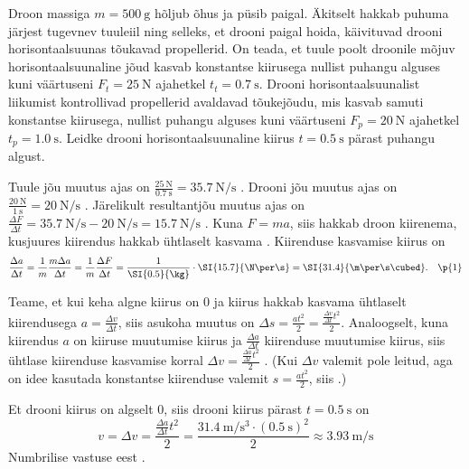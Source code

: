 
Droon massiga $m=\SI{500}\g$ hõljub õhus ja püsib paigal. Äkitselt hakkab puhuma järjest tugevnev tuuleiil ning selleks, et drooni paigal hoida, käivituvad drooni horisontaalsuunas tõukavad propellerid. On teada, et tuule poolt droonile mõjuv horisontaalsuunaline jõud kasvab konstantse kiirusega nullist puhangu alguses kuni väärtuseni $F_t=\SI{25}\N$ ajahetkel $t_t= \SI{0.7}\s$. Drooni horisontaalsuunalist liikumist kontrollivad propellerid avaldavad tõukejõudu, mis kasvab samuti konstantse kiirusega, nullist puhangu alguses kuni väärtuseni $F_p=\SI{20}\N$ ajahetkel $t_p= \SI{1.0}\s$. Leidke drooni horisontaalsuunaline kiirus $t=\SI{0.5}\s$ pärast puhangu algust.


\hint

\solu
Tuule jõu muutus ajas on $\frac{\SI{25}{\N}}{\SI{0.7}{\s}} = \SI{35.7}{\N\per\s}$ . Drooni jõu muutus ajas on $\frac{\SI{20}{\N}}{\SI{1}{\s}} = \SI{20}{\N\per\s}$ . Järelikult resultantjõu muutus ajas on $\frac{\Delta F}{\Delta t} = \SI{35.7}{\N\per\s}-\SI{20}{\N\per\s}=\SI{15.7}{\N\per\s}$ . Kuna $F=ma$, siis hakkab droon kiirenema, kusjuures kiirendus hakkab ühtlaselt kasvama . Kiirenduse kasvamise kiirus on
\begin{equation*}
    \frac{\Delta a}{\Delta t} = \frac{1}{m}\frac{m\Delta a}{\Delta t} = \frac{1}{m}\frac{\Delta F}{\Delta t} = \frac{1}{\SI{0.5}{\kg}}\cdot \SI{15.7}{\N\per\s} = \SI{31.4}{\m\per\s\cubed}. \quad \p{1}
\end{equation*}

Teame, et kui keha algne kiirus on 0 ja kiirus hakkab kasvama ühtlaselt kiirendusega $a = \frac{\Delta v}{\Delta t}$, siis asukoha muutus on $\Delta s = \frac{at^2}{2} = \frac{\frac{\Delta v}{\Delta t}t^2}{2}$. Analoogselt, kuna kiirendus $a$ on kiiruse muutumise kiirus ja $\frac{\Delta a}{\Delta t}$ kiirenduse muutumise kiirus, siis ühtlase kiirenduse kasvamise korral $\Delta v = \frac{\frac{\Delta a}{\Delta t}t^2}{2}$ . (Kui $\Delta v$ valemit pole leitud, aga on idee kasutada konstantse kiirenduse valemit $s = \frac{at^2}{2}$, siis .)

Et drooni kiirus on algselt 0, siis drooni kiirus pärast $t=\SI{0.5}{\s}$ on
\begin{equation*}
    v = \Delta v = \frac{\frac{\Delta a}{\Delta t}t^2}{2} = \frac{\SI{31.4}{\m\per\s\cubed}\cdot (\SI{0.5}{\s})^2}{2} \approx \SI{3.93}{\m\per\s}
\end{equation*}
Numbrilise vastuse eest .
\probend
